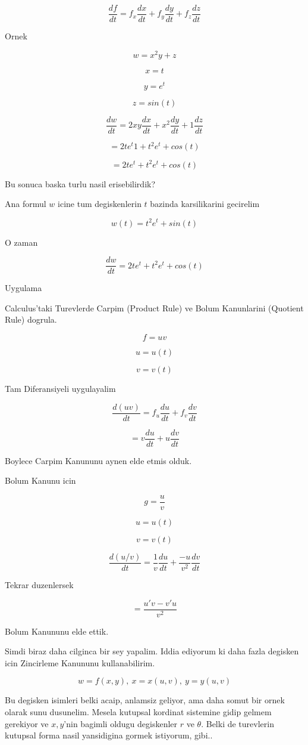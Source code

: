 \documentclass[12pt,fleqn]{article}
\begin{document}
\[ \frac{df}{dt} = f_x\frac{dx}{dt} + f_y\frac{dy}{dt} + f_z\frac{dz}{dt} \]

Ornek

\[ w = x^2y + z \]

\[ x = t \]

\[ y = e^t \]

\[ z = sin(t) \]

\[ \frac{dw}{dt} = 2xy \frac{dx}{dt} + x^2 \frac{dy}{dt} + 1 \frac{dz}{dt}\]

\[ = 2te^t 1 + t^2e^t+cos(t) \]

\[ = 2te^t + t^2e^t+cos(t) \]

Bu sonuca baska turlu nasil erisebilirdik? 

Ana formul $w$ icine tum degiskenlerin $t$ bazinda karsilikarini gecirelim

\[ w(t) = t^2e^t + sin(t) \]

O zaman

\[ \frac{dw}{dt} = 2te^t + t^2e^t + cos(t) \]

Uygulama

Calculus'taki Turevlerde Carpim (Product Rule) ve Bolum Kanunlarini
(Quotient Rule) dogrula.

\[ f = uv \]

\[ u=u(t) \]

\[ v=v(t) \]

Tam Diferansiyeli uygulayalim

\[ \frac{d(uv)}{dt} = f_u\frac{du}{dt} + f_v \frac{dv}{dt}\]

\[  = v\frac{du}{dt} + u \frac{dv}{dt}\]

Boylece Carpim Kanununu aynen elde etmis olduk. 

Bolum Kanunu icin

\[ g = \frac{u}{v} \]

\[ u=u(t) \]

\[ v=v(t) \]

\[ \frac{d(u/v)}{dt} = \frac{1}{v} \frac{du}{dt} + \frac{-u}{v^2}\frac{dv}{dt}\]

Tekrar duzenlersek

\[ = \frac{u'v - v'u}{v^2} \]

Bolum Kanununu elde ettik.

Simdi biraz daha cilginca bir sey yapalim. Iddia ediyorum ki daha fazla
degisken icin Zincirleme Kanununu kullanabilirim. 

\[ w = f(x,y), \ x = x(u,v), \ y = y(u,v) \]

Bu degisken isimleri belki acaip, anlamsiz geliyor, ama daha somut bir
ornek olarak sunu dusunelim. Mesela kutupsal kordinat sistemine gidip
gelmem gerekiyor ve $x,y$'nin bagimli oldugu degiskenler $r$ ve
$\theta$. Belki de turevlerin kutupsal forma nasil yansidigina gormek
istiyorum, gibi..
\end{document}
